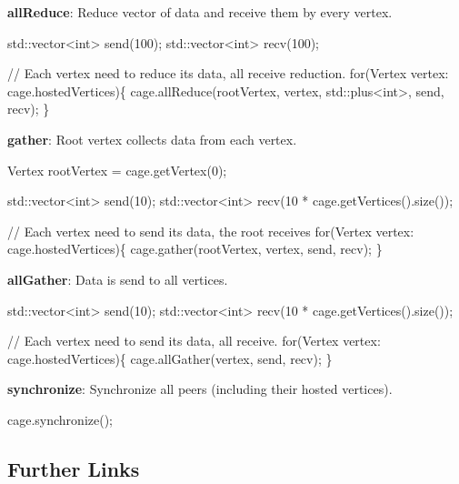 \begin{DoxyItemize}
\item {\bfseries all\+Reduce}\+: Reduce vector of data and receive them by every vertex. 
\begin{DoxyCode}
std::vector<int> send(100);
std::vector<int> recv(100);

\textcolor{comment}{// Each vertex need to reduce its data, all receive reduction.}
\textcolor{keywordflow}{for}(Vertex vertex: cage.hostedVertices)\{
    cage.allReduce(rootVertex, vertex, std::plus<int>, send, recv);
\}
\end{DoxyCode}

\item {\bfseries gather}\+: Root vertex collects data from each vertex. 
\begin{DoxyCode}
Vertex rootVertex = cage.getVertex(0);

std::vector<int> send(10);
std::vector<int> recv(10 * cage.getVertices().size());

\textcolor{comment}{// Each vertex need to send its data, the root receives}
\textcolor{keywordflow}{for}(Vertex vertex: cage.hostedVertices)\{
    cage.gather(rootVertex, vertex, send, recv);
\}
\end{DoxyCode}

\item {\bfseries all\+Gather}\+: Data is send to all vertices. 
\begin{DoxyCode}
std::vector<int> send(10);
std::vector<int> recv(10 * cage.getVertices().size());

\textcolor{comment}{// Each vertex need to send its data, all receive.}
\textcolor{keywordflow}{for}(Vertex vertex: cage.hostedVertices)\{
    cage.allGather(vertex, send, recv);
\}
\end{DoxyCode}

\item {\bfseries synchronize}\+: Synchronize all peers (including their hosted vertices). 
\begin{DoxyCode}
cage.synchronize();
\end{DoxyCode}

\end{DoxyItemize}

\subsection*{Further Links}


